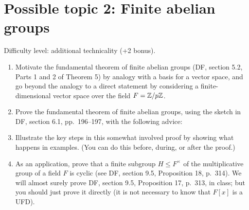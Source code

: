 \section*{Possible topic 2: Finite abelian groups}
Difficulty level: additional technicality (+2 bonus).
\begin{enumerate}[label=\arabic{enumi}.]
  \item Motivate the fundamental theorem of finite abelian groups (DF, section 5.2, 
  Parts 1 and 2 of Theorem 5) by analogy with a basis for a vector space, and go 
  beyond the analogy to a direct statement by considering a finite-dimensional vector
  space over the field $F=\mathbb{Z}/p\mathbb{Z}$.    
  \item Prove the fundamental theorem of finite abelian groups, using the sketch in 
  DF, section 6.1, pp.~196--197, with the following advice:
  \item Illustrate the key steps in this somewhat involved proof by showing what 
  happens in examples.  (You can do this before, during, or after the proof.)
  \item As an application, prove that a finite subgroup $H \leq F^\times$ of the 
  multiplicative group of a field $F$ is cyclic (see DF, section 9.5, Proposition 18,
  p.~314).  We will almost surely prove DF, section 9.5, Proposition 17, p.~313, in 
  class; but you should just prove it directly (it is not necessary to know that 
  $F[x]$ is a UFD).
\end{enumerate}
